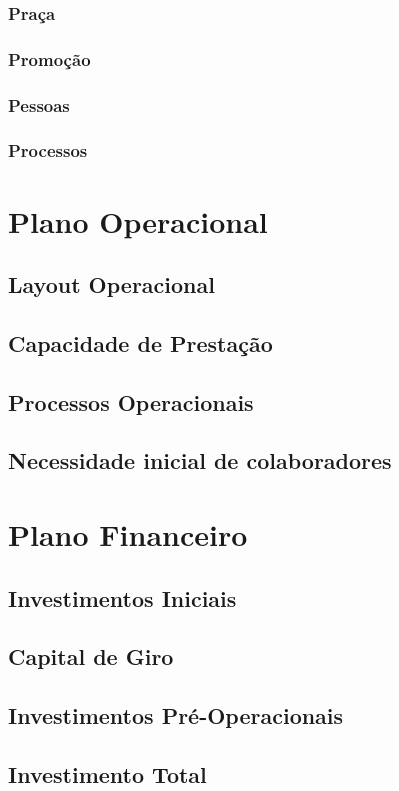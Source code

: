 \documentclass[a4paper, 12pt]{paper}
\begin{document}
\subsubsection{Praça}
\subsubsection{Promoção}
\subsubsection{Pessoas}
\subsubsection{Processos}
\newpage
\section{Plano Operacional}
\subsection{Layout Operacional}
\subsection{Capacidade de Prestação}
\subsection{Processos Operacionais}
\subsection{Necessidade inicial de colaboradores}
\newpage
\section{Plano Financeiro}
\subsection{Investimentos Iniciais}
\subsection{Capital de Giro}
\subsection{Investimentos Pré-Operacionais}
\subsection{Investimento Total}
\end{document}
